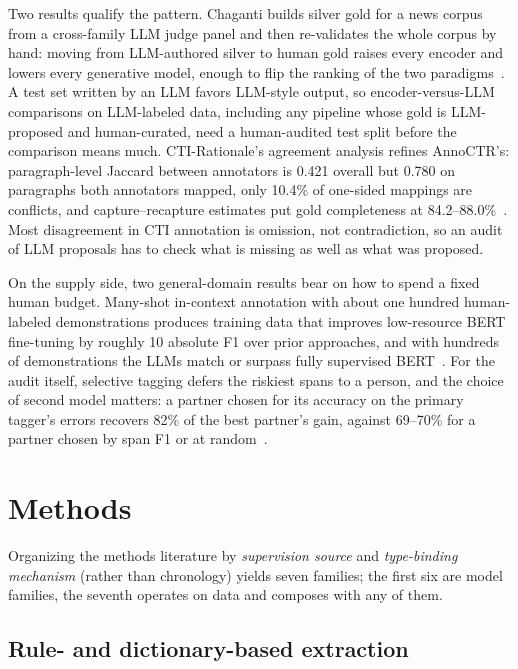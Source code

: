 \documentclass[11pt]{article}
\begin{document}
Two results qualify the pattern. Chaganti builds silver gold for a news corpus from a cross-family LLM judge panel and then re-validates the whole corpus by hand: moving from LLM-authored silver to human gold raises every encoder and lowers every generative model, enough to flip the ranking of the two paradigms~\citep{chaganti2026ondevice}. A test set written by an LLM favors LLM-style output, so encoder-versus-LLM comparisons on LLM-labeled data, including any pipeline whose gold is LLM-proposed and human-curated, need a human-audited test split before the comparison means much. CTI-Rationale's agreement analysis refines AnnoCTR's: paragraph-level Jaccard between annotators is 0.421 overall but 0.780 on paragraphs both annotators mapped, only 10.4\% of one-sided mappings are conflicts, and capture--recapture estimates put gold completeness at 84.2--88.0\%~\citep{resul2026ctirationale}. Most disagreement in CTI annotation is omission, not contradiction, so an audit of LLM proposals has to check what is missing as well as what was proposed.

On the supply side, two general-domain results bear on how to spend a fixed human budget. Many-shot in-context annotation with about one hundred human-labeled demonstrations produces training data that improves low-resource BERT fine-tuning by roughly 10 absolute F1 over prior approaches, and with hundreds of demonstrations the LLMs match or surpass fully supervised BERT~\citep{zhang2026manyshot}. For the audit itself, selective tagging defers the riskiest spans to a person, and the choice of second model matters: a partner chosen for its accuracy on the primary tagger's errors recovers 82\% of the best partner's gain, against 69--70\% for a partner chosen by span F1 or at random~\citep{kotte2026partner}.

\section{Methods}

Organizing the methods literature by \emph{supervision source} and \emph{type-binding mechanism} (rather than chronology) yields seven families; the first six are model families, the seventh operates on data and composes with any of them.

\subsection{Rule- and dictionary-based extraction}
\end{document}
